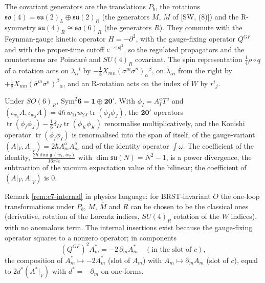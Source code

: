 \begin{remark}
The covariant generators are the translations $P_b$, the rotations $\mathfrak{so}(4)=\mathfrak{su}(2)_L\oplus\mathfrak{su}(2)_R$ (the generators $M$, $\bar M$ of [SW, (8)]) and the R-symmetry $\mathfrak{su}(4)_R\cong\mathfrak{so}(6)_R$ (the generators $R$). They commute with the Feynman-gauge kinetic operator $H=-\partial^2$, with the gauge-fixing operator $Q^{GF}$ and with the proper-time cutoff $e^{-\varepsilon|p|^2}$, so the regulated propagators and the counterterms are Poincaré and $SU(4)_R$ covariant. The spin representation $\tfrac14\rho\circ q$ of a rotation acts on $\lambda_\alpha{}^i$ by $-\tfrac18X_{mn}(\sigma^m\bar\sigma^n)_\alpha{}^\beta$, on $\bar\lambda_{\dot\alpha i}$ from the right by $+\tfrac18X_{mn}(\bar\sigma^m\sigma^n)^{\dot\beta}{}_{\dot\alpha}$, and an R-rotation acts on the index of $W$ by $r^i{}_j$.
\end{remark}

\begin{remark}
Under $SO(6)_R$, $\mathrm{Sym}^2\mathbf6=\mathbf1\oplus\mathbf{20'}$. With $\phi_I=A^a_IT^a$ and $(\iota_{w_1}A,\iota_{w_2}A)=4\hbar\,w_{1I}w_{2J}\operatorname{tr}(\phi_I\phi_J)$, the $\mathbf{20'}$ operators $\operatorname{tr}(\phi_I\phi_J)-\tfrac16\delta_{IJ}\operatorname{tr}(\phi_K\phi_K)$ renormalise multiplicatively, and the Konishi operator $\operatorname{tr}(\phi_I\phi_I)$ is renormalised into the span of itself, of the gauge-variant $(A|_V,A|_V)=2\hbar A^a_mA^a_m$ and of the identity operator $\int\omega$. The coefficient of the identity, $\frac{2\hbar\dim\mathfrak g\,(w_1,w_2)}{16\pi^2\varepsilon}$ with $\dim\mathfrak{su}(N)=N^2-1$, is a power divergence, the subtraction of the vacuum expectation value of the bilinear; the coefficient of $(A|_V,A|_V)$ is $0$.
\end{remark}

\begin{remark}
Remark \ref{rem:c7-internal} in physics language: for BRST-invariant $O$ the one-loop transformations under $P_b$, $M$, $\bar M$ and $R$ can be chosen to be the classical ones (derivative, rotation of the Lorentz indices, $SU(4)_R$ rotation of the $W$ indices), with no anomalous term. The internal insertions exist because the gauge-fixing operator squares to a nonzero operator; in components
\[
(Q^{GF})^2A^*_m=-2\,\partial_mA^*_m\quad(\text{in the slot of }c),
\]
the composition of $A^*_m\mapsto-2A^*_m$ (slot of $A_m$) with $A_m\mapsto\partial_mA_m$ (slot of $c$), equal to $2d^*(A^*|_V)$ with $d^*=-\partial_m$ on one-forms.
\end{remark}

